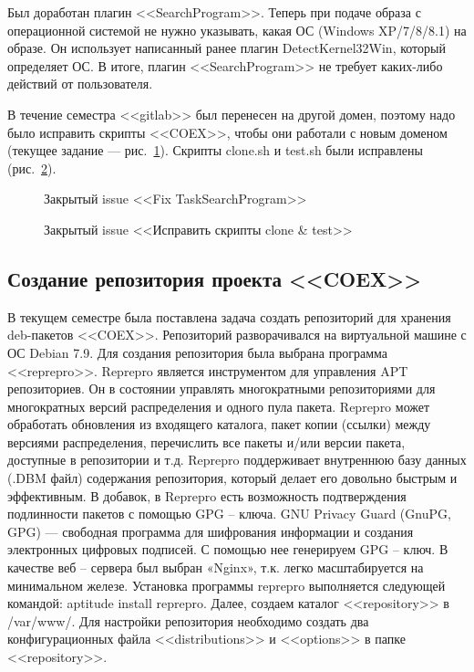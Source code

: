 Был доработан плагин <<SearchProgram>>. Теперь при подаче образа с операционной системой не нужно указывать, какая ОС (Windows XP/7/8/8.1) на образе. Он использует написанный ранее плагин DetectKernel32Win, который определяет ОС. В итоге, плагин <<SearchProgram>> не требует каких-либо действий от пользователя.

В течение семестра <<gitlab>> был перенесен на другой домен, поэтому надо было исправить скрипты <<COEX>>, чтобы они работали с новым доменом (текущее задание --- рис.~\ref{kucher_2:kucher_2}). Скрипты clone.sh и test.sh были исправлены (рис.~\ref{kucher_3:kucher_3}).

\begin{figure}[h!]
\caption{ Закрытый issue <<Fix TaskSearchProgram>> }
\label{kucher_2:kucher_2}
\end{figure}
	
\begin{figure}[h!]
\caption{ Закрытый issue <<Исправить скрипты clone & test>> }
\label{kucher_3:kucher_3}
\end{figure}
	
\clearpage 
\subsection{Создание репозитория проекта <<COEX>>}

В текущем семестре была поставлена задача создать репозиторий для хранения deb-пакетов <<COEX>>.
Репозиторий разворачивался на виртуальной машине с ОС Debian 7.9. Для создания репозитория была выбрана программа <<reprepro>>.
Reprepro является инструментом для управления APT репозиториев. Он в состоянии управлять многократными репозиториями для многократных версий распределения и одного пула пакета. Reprepro может обработать обновления из входящего каталога, пакет копии (ссылки) между версиями распределения, перечислить все пакеты и/или версии пакета, доступные в репозитории и т.д. 
Reprepro поддерживает внутреннюю базу данных (.DBM файл) содержания репозитория, который делает его довольно быстрым и эффективным.
В добавок, в Reprepro есть возможность подтверждения подлинности пакетов с помощью GPG – ключа.
GNU Privacy Guard (GnuPG, GPG) — свободная программа для шифрования информации и создания электронных цифровых подписей. С помощью нее генерируем GPG – ключ.
В качестве веб – сервера был выбран «Nginx», т.к. легко масштабируется на минимальном железе.
Установка программы reprepro выполняется следующей командой: aptitude install reprepro. Далее, создаем каталог <<repository>> в /var/www/. Для настройки репозитория необходимо создать два конфигурационных файла <<distributions>> и <<options>> в папке <<repository>>.~\cite{anosov} 

